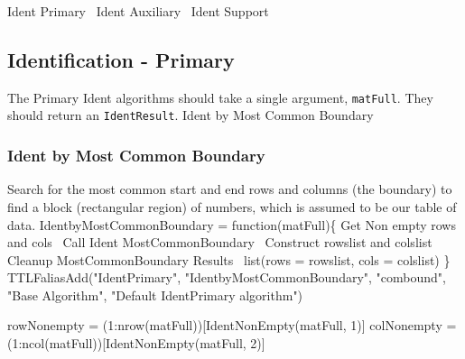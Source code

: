 \documentclass[a4paper]{article}
\begin{document}
\nwenddocs{}\endmoddef
\LA{}Ident Primary~{\nwtagstyle{}}\RA{}
\LA{}Ident Auxiliary~{\nwtagstyle{}}\RA{}
\LA{}Ident Support~{\nwtagstyle{}}\RA{}
\nwendcode{}\nwdocspar

\subsection{Identification - Primary}
The Primary Ident algorithms should take a single argument,
\verb|matFull|. They should return an \verb|IdentResult|.
\label{sec:IdentPrimary}
\nwenddocs{}\endmoddef
\LA{}Ident by Most Common Boundary~{\nwtagstyle{}}\RA{}
\nwendcode{}\nwdocspar

\subsubsection{Ident by Most Common Boundary}
Search for the most common start and end rows and columns (the
boundary) to find a block (rectangular region) of numbers, which is
assumed to be our table of data.
\nwenddocs{}\endmoddef
IdentbyMostCommonBoundary =
  function(matFull)\{
    \LA{}Get Non empty rows and cols~{\nwtagstyle{}}\RA{}
    \LA{}Call Ident MostCommonBoundary~{\nwtagstyle{}}\RA{}
    \LA{}Construct rowslist and colslist~{\nwtagstyle{}}\RA{}
    \LA{}Cleanup MostCommonBoundary Results~{\nwtagstyle{}}\RA{}
    list(rows = rowslist, cols = colslist)
  \}
TTLFaliasAdd("IdentPrimary", "IdentbyMostCommonBoundary", "combound",
             "Base Algorithm", "Default IdentPrimary algorithm")
\nwendcode{}\nwdocspar

\nwenddocs{}\endmoddef
rowNonempty = (1:nrow(matFull))[IdentNonEmpty(matFull, 1)]
colNonempty = (1:ncol(matFull))[IdentNonEmpty(matFull, 2)]
\nwendcode{}\nwdocspar
\end{document}
